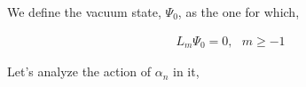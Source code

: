 \problem{}
\probitem{}

We define the vacuum state, $\Psi_0$, as the one for which,

\begin{align*}
    L_m\Psi_0=0,\ \ \ m\geq -1
\end{align*}

Let's analyze the action of $\alpha_n$ in it,








